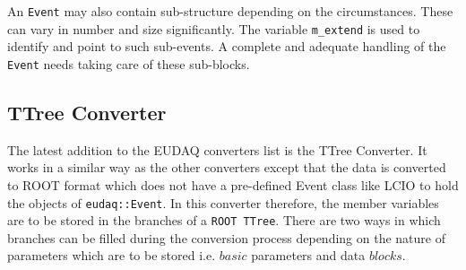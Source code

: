 An \lstinline[style=cpp]{Event} may also contain sub-structure depending on the circumstances. These can vary in number and size significantly. The variable \lstinline[style=cpp]{m_extend} is used to identify and point to such sub-events. A complete and adequate handling of the \lstinline[style=cpp]{Event} needs taking care of these sub-blocks. 

 
\subsection{ TTree Converter} 
 
The latest addition to the EUDAQ converters list is the TTree Converter. It works in a similar way as the other converters except that the data is converted to ROOT format which does not have a pre-defined Event class like LCIO to hold the objects of \texttt{eudaq::Event}. In this converter therefore, the member variables are to be stored in the branches of a \texttt{ROOT TTree}. There are two ways in which branches can be filled during the conversion process depending on the nature of parameters which are to be stored i.e. $basic$ parameters and data $blocks$. 
 
